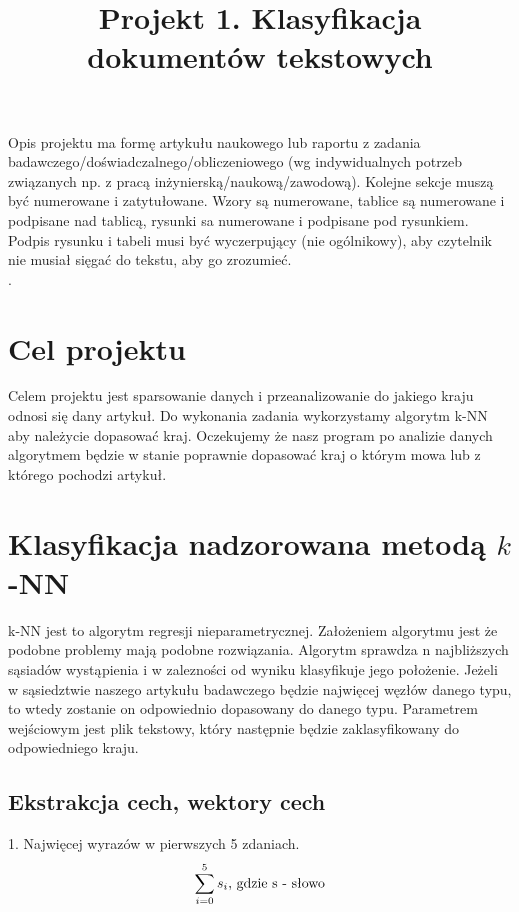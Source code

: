 \documentclass{classrep}
\author{
  \studentinfo{Przemysław Lis}{229940} \and
  \studentinfo{Michał Olczak}{229972} }
\title{Projekt 1. Klasyfikacja dokumentów tekstowych}
\begin{document}
\maketitle

Opis projektu ma formę artykułu naukowego lub raportu z zadania
badawczego/doświadczalnego/obliczeniowego (wg indywidualnych potrzeb związanych np. z
pracą inżynierską/naukową/zawodową). Kolejne sekcje muszą być numerowane i
zatytułowane. Wzory są numerowane, tablice są numerowane i podpisane nad
tablicą, rysunki sa numerowane i podpisane pod rysunkiem. Podpis rysunku i
tabeli musi być wyczerpujący (nie ogólnikowy), aby czytelnik nie musiał sięgać do tekstu, aby go
zrozumieć.\\

. 

\section{Cel projektu}
Celem projektu jest sparsowanie danych i przeanalizowanie do jakiego kraju odnosi się 
dany artykuł. Do wykonania zadania wykorzystamy algorytm k-NN aby należycie dopasować
kraj. Oczekujemy że nasz program po analizie danych algorytmem będzie w stanie poprawnie
dopasować kraj o którym mowa lub z którego pochodzi artykuł.\\
\noindent


\section{Klasyfikacja nadzorowana metodą $k$-NN}
k-NN jest to algorytm  regresji nieparametrycznej. Założeniem algorytmu jest że podobne problemy mają podobne rozwiązania. Algorytm sprawdza n najbliższych sąsiadów wystąpienia i w zalezności od wyniku klasyfikuje jego położenie. Jeżeli w sąsiedztwie naszego artykułu badawczego będzie najwięcej węzłów danego typu, to wtedy zostanie on odpowiednio dopasowany do danego typu.
Parametrem wejściowym jest plik tekstowy, który następnie będzie zaklasyfikowany do odpowiedniego kraju.\\
\noindent

\subsection{Ekstrakcja cech, wektory cech}
1. Najwięcej wyrazów w pierwszych 5 zdaniach.\\
\begin{displaymath}
\sum_{i = 0}^{5} s_i \textrm{, gdzie s - słowo}\\
\end{displaymath}
\end{document}
